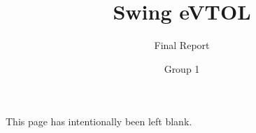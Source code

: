 \documentclass{tudelft-report}
\begin{document}

\newcommand{\riskcolor}[1]{
    \ifdim #1 pt = 0 pt \cellcolor{low}\else
    \ifdim #1 pt > 0 pt \ifdim #1 pt < 1 pt \cellcolor{low!70!yellow}\else
    \ifdim #1 pt = 1 pt \cellcolor{low!50!yellow}\else
    \ifdim #1 pt > 1 pt \ifdim #1 pt < 2 pt \cellcolor{medium-low}\else
    \ifdim #1 pt = 2 pt \cellcolor{medium-low!70!orange}\else
    \ifdim #1 pt > 2 pt \ifdim #1 pt < 3 pt \cellcolor{medium}\else
    \ifdim #1 pt = 3 pt \cellcolor{medium!50!orange}\else
    \ifdim #1 pt > 3 pt \ifdim #1 pt < 4 pt \cellcolor{medium-high}\else
    \ifdim #1 pt = 4 pt \cellcolor{medium-high!70!red}\else
    \ifdim #1 pt > 4 pt \ifdim #1 pt < 5 pt \cellcolor{high!50!red}\else
    \ifdim #1 pt = 5 pt \cellcolor{high}\fi\fi\fi\fi\fi\fi\fi\fi\fi\fi\fi\fi\fi\fi
    #1
}


\frontmatter

\title{Swing eVTOL}
\subtitle{Final Report}
\author{Group 1}

\subject{AE3200: Design Synthesis Exercise} %
\makecover

\newpage
\thispagestyle{empty}
\vspace*{\fill}
\begin{center}
    This page has intentionally been left blank.
\end{center}
\vspace*{\fill}
\newpage






%
%



\setcounter{tocdepth}{1} %
 \renewcommand{\baselinestretch}{0.9}\normalsize
\tableofcontents

 \renewcommand{\baselinestretch}{1.0}\normalsize


%
\end{document}
